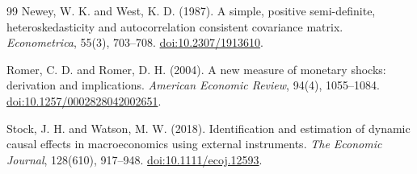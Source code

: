 \documentclass[11pt,a4paper]{article}
\begin{document}
\begin{thebibliography}{99}
Newey, W. K. and West, K. D. (1987). A simple, positive semi-definite, heteroskedasticity and autocorrelation consistent covariance matrix. \emph{Econometrica}, 55(3), 703--708. \href{https://doi.org/10.2307/1913610}{doi:10.2307/1913610}.

Romer, C. D. and Romer, D. H. (2004). A new measure of monetary shocks: derivation and implications. \emph{American Economic Review}, 94(4), 1055--1084. \href{https://doi.org/10.1257/0002828042002651}{doi:10.1257/0002828042002651}.

Stock, J. H. and Watson, M. W. (2018). Identification and estimation of dynamic causal effects in macroeconomics using external instruments. \emph{The Economic Journal}, 128(610), 917--948. \href{https://doi.org/10.1111/ecoj.12593}{doi:10.1111/ecoj.12593}.

\end{thebibliography}
\end{document}
